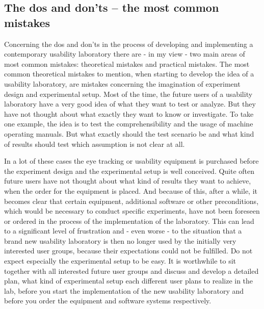 \begin{
}[h]
\section{The dos and don'ts – the most common mistakes }

Concerning the dos and don'ts in the process of developing and implementing a contemporary usability laboratory there are - in my view - two main areas of most common mistakes: theoretical mistakes and practical mistakes. The most common theoretical mistakes to mention, when starting to develop the idea of a usability laboratory, are mistakes concerning the imagination of experiment design and experimental setup. Most of the time, the future users of a usability laboratory have a very good idea of what they want to test or analyze. But they have not thought about what exactly they want to know or investigate. To take one example, the idea is to test the comprehensibility and the usage of machine operating manuals. But what exactly should the test scenario be and what kind of results should test which assumption is not clear at all. 

\begin{styleBodyTextIndent}
In a lot of these cases the eye tracking or usability equipment is purchased before the experiment design and the experimental setup is well conceived. Quite often future users have not thought about what kind of results they want to achieve, when the order for the equipment is placed. And because of this, after a while, it becomes clear that certain equipment, additional software or other preconditions, which would be necessary to conduct specific experiments, have not been foreseen or ordered in the process of the implementation of the laboratory. This can lead to a significant level of frustration and - even worse - to the situation that a brand new usability laboratory is then no longer used by the initially very interested user groups, because their expectations could not be fulfilled. Do not expect especially the experimental setup to be easy. It is worthwhile to sit together with all interested future user groups and discuss and develop a detailed plan, what kind of experimental setup each different user plans to realize in the lab, before you start the implementation of the new usability laboratory and before you order the equipment and software systems respectively.
\end{styleBodyTextIndent}


\end{
}
